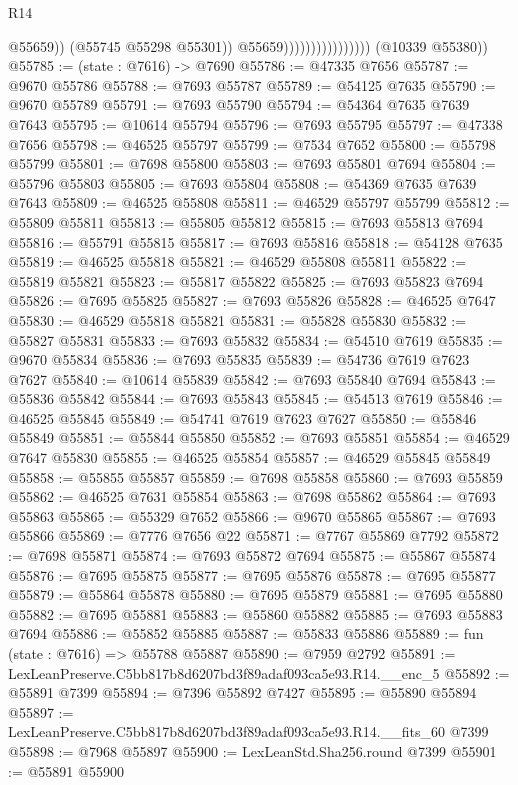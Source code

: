 \begin{lexlean}{R14}
\begin{coremodule}
                                            @55659))
                                        (@55745 @55298 @55301))
                                      @55659))))))))))))))))
      (@10339 @55380))
@55785 := (state : @7616) -> @7690
@55786 := @47335 @7656
@55787 := @9670 @55786
@55788 := @7693 @55787
@55789 := @54125 @7635
@55790 := @9670 @55789
@55791 := @7693 @55790
@55794 := @54364 @7635 @7639 @7643
@55795 := @10614 @55794
@55796 := @7693 @55795
@55797 := @47338 @7656
@55798 := @46525 @55797
@55799 := @7534 @7652
@55800 := @55798 @55799
@55801 := @7698 @55800
@55803 := @7693 @55801 @7694
@55804 := @55796 @55803
@55805 := @7693 @55804
@55808 := @54369 @7635 @7639 @7643
@55809 := @46525 @55808
@55811 := @46529 @55797 @55799
@55812 := @55809 @55811
@55813 := @55805 @55812
@55815 := @7693 @55813 @7694
@55816 := @55791 @55815
@55817 := @7693 @55816
@55818 := @54128 @7635
@55819 := @46525 @55818
@55821 := @46529 @55808 @55811
@55822 := @55819 @55821
@55823 := @55817 @55822
@55825 := @7693 @55823 @7694
@55826 := @7695 @55825
@55827 := @7693 @55826
@55828 := @46525 @7647
@55830 := @46529 @55818 @55821
@55831 := @55828 @55830
@55832 := @55827 @55831
@55833 := @7693 @55832
@55834 := @54510 @7619
@55835 := @9670 @55834
@55836 := @7693 @55835
@55839 := @54736 @7619 @7623 @7627
@55840 := @10614 @55839
@55842 := @7693 @55840 @7694
@55843 := @55836 @55842
@55844 := @7693 @55843
@55845 := @54513 @7619
@55846 := @46525 @55845
@55849 := @54741 @7619 @7623 @7627
@55850 := @55846 @55849
@55851 := @55844 @55850
@55852 := @7693 @55851
@55854 := @46529 @7647 @55830
@55855 := @46525 @55854
@55857 := @46529 @55845 @55849
@55858 := @55855 @55857
@55859 := @7698 @55858
@55860 := @7693 @55859
@55862 := @46525 @7631 @55854
@55863 := @7698 @55862
@55864 := @7693 @55863
@55865 := @55329 @7652
@55866 := @9670 @55865
@55867 := @7693 @55866
@55869 := @7776 @7656 @22
@55871 := @7767 @55869 @7792
@55872 := @7698 @55871
@55874 := @7693 @55872 @7694
@55875 := @55867 @55874
@55876 := @7695 @55875
@55877 := @7695 @55876
@55878 := @7695 @55877
@55879 := @55864 @55878
@55880 := @7695 @55879
@55881 := @7695 @55880
@55882 := @7695 @55881
@55883 := @55860 @55882
@55885 := @7693 @55883 @7694
@55886 := @55852 @55885
@55887 := @55833 @55886
@55889 := fun (state : @7616) => @55788 @55887
@55890 := @7959 @2792
@55891 := LexLeanPreserve.C5bb817b8d6207bd3f89adaf093ca5e93.R14.__enc_5
@55892 := @55891 @7399
@55894 := @7396 @55892 @7427
@55895 := @55890 @55894
@55897 := LexLeanPreserve.C5bb817b8d6207bd3f89adaf093ca5e93.R14.__fits_60 @7399
@55898 := @7968 @55897
@55900 := LexLeanStd.Sha256.round @7399
@55901 := @55891 @55900

\end{coremodule}
\end{lexlean}

